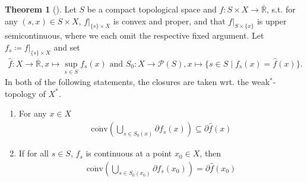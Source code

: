 \documentclass[10pt, leqno]{amsart}
\theoremstyle{definition}
\newtheorem{theorem}{Theorem}[section]
\theoremstyle{remark}
\begin{document}
    \begin{theorem}[{\cite[pp. 201-204]{IoffeTihomirov}}] \label{supremum_theorem}
        Let \(S\) be a compact topological space and \(f\colon S \times X \to \overline{\mathbb{R}}\), s.t. for any \((s, x) \in S \times X\), \(f|_{\{s\} \times X}\) is convex and proper, and that \(f|_{S \times \{x\}}\) is upper semicontinuous, where we each omit the respective fixed argument. Let \(f_s \coloneqq f|_{\{s\} \times X}\) and set
        \begin{align}
            \hat{f}\colon X \to \overline{\mathbb{R}}, x \mapsto \sup_{s \in S} f_s(x) \text{ and } S_0\colon X \to \mathcal{P}(S), x \mapsto \{s \in S \mid f_s(x) = \hat{f}(x)\}.
        \end{align}
        In both of the following statements, the closures are taken wrt. the weak\({}^*\)-topology of \(X^*\).
        \begin{enumerate}[label=(\roman*), wide]
            \item \label{supremum_theorem_1} For any \(x \in X\)
            \begin{align}
                \overline{\text{conv}}\left(\bigcup_{s \in S_0(x)} \partial f_s(x)\right) \subseteq \partial \hat{f}(x)
            \end{align}
            \item \label{supremum_theorem_2} If for all \(s \in S\), \(f_s\) is continuous at a point \(x_0 \in X\), then
            \begin{align}
                \overline{\text{conv}}\left(\bigcup_{s \in S_0(x_0)} \partial f_s(x_0)\right) = \partial \hat{f}(x_0)
            \end{align}
        \end{enumerate}
    \end{theorem}
\end{document}
